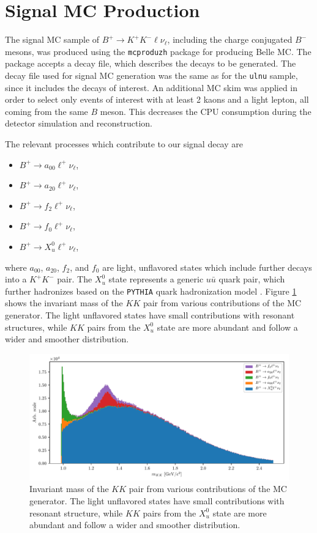 \section{Signal MC Production}

The signal MC sample of $B^+ \to K^+ K^- \ell \nu_\ell$, including the charge conjugated $B^-$ mesons, was produced using the \texttt{mcproduzh} \cite{lange2001evtgen,agostinelli2003geant4} package for producing Belle MC. The package accepts a decay file, which describes the decays to be generated. The decay file used for signal MC generation was the same as for the \texttt{ulnu} sample, since it includes the decays of interest. An additional MC skim was applied in order to select only events of interest with at least 2 kaons and a light lepton, all coming from the same $B$ meson. This decreases the CPU consumption during the detector simulation and reconstruction.

The relevant processes which contribute to our signal decay are
\begin{itemize}
	\item $B^+ \to a_{00} \ell^+ \nu_\ell$,
	\item $B^+ \to a_{20} \ell^+ \nu_\ell$,
	\item $B^+ \to f_{2} \ell^+ \nu_\ell$,
	\item $B^+ \to f_{0} \ell^+ \nu_\ell$,
	\item $B^+ \to X_{u}^0 \ell^+ \nu_\ell$,
\end{itemize}
where $a_{00}$, $a_{20}$, $f_{2}$, and $f_{0}$ are light, unflavored states which include further decays into a $K^+K^-$ pair. The $X_u^0$ state represents a generic $u \bar u$ quark pair, which further hadronizes based on the \texttt{PYTHIA} quark hadronization model \cite{sjostrand2006pythia}. Figure \ref{fig:KKsrc} shows the invariant mass of the $KK$ pair from various contributions of the MC generator. The light unflavored states have small contributions with resonant structures, while $KK$ pairs from the $X_u^0$ state are more abundant and follow a wider and smoother distribution.

\begin{figure}[H]
	\centering
	\includegraphics[width=\linewidth]{fig/KKlnu_src}
	\captionsetup{width=.8\linewidth}
	\caption{Invariant mass of the $KK$ pair from various contributions of the MC generator. The light unflavored states have small contributions with resonant structure, while $KK$ pairs from the $X_u^0$ state are more abundant and follow a wider and smoother distribution.}
	\label{fig:KKsrc}
\end{figure}

